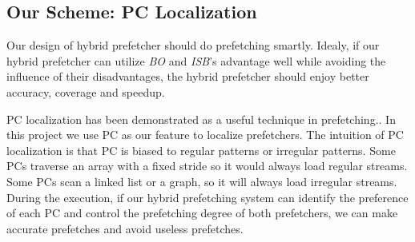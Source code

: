   

\subsection{Our Scheme: PC Localization}
  \label{sec:goal}
  Our design of hybrid prefetcher should do prefetching smartly. Idealy, if our hybrid prefetcher can utilize \emph{BO} and \emph{ISB}'s advantage well while avoiding the influence of their disadvantages, the hybrid prefetcher should enjoy better accuracy, coverage and speedup. \par
  PC localization has been demonstrated as a useful technique in prefetching.\cite{isbpaper, ghbpaper, shippaper}. In this project we use PC as our feature to localize prefetchers. The intuition of PC localization is that PC is biased to regular patterns or irregular patterns. 
  Some PCs traverse an array with a fixed stride so it would always load regular streams. Some PCs scan a linked list or a graph, so it will always load irregular streams. 
  During the execution, if our hybrid prefetching system can identify the preference of each PC and control the prefetching degree of both prefetchers, we can make accurate prefetches and avoid useless prefetches. \par
  
  
  
  

